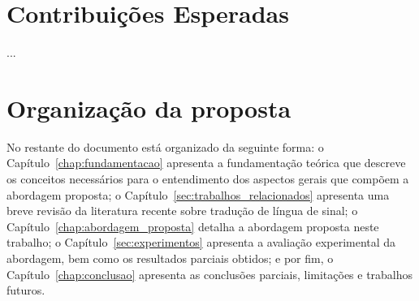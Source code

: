 \section{Contribuições Esperadas}\label{sec:contribuicao}

...

\section{Organização da proposta}\label{sec:organizacao}

No restante do documento está organizado da seguinte forma: o Capítulo~\ref{chap:fundamentacao} apresenta a fundamentação teórica que descreve os conceitos necessários para o entendimento dos aspectos gerais que compõem a abordagem proposta; o Capítulo~\ref{sec:trabalhos_relacionados} apresenta uma breve revisão da literatura recente sobre tradução de língua de sinal; o Capítulo~\ref{chap:abordagem_proposta} detalha a abordagem proposta neste trabalho; o Capítulo~\ref{sec:experimentos} apresenta a avaliação experimental da abordagem, bem como os resultados parciais obtidos; e por fim, o Capítulo~\ref{chap:conclusao} apresenta as conclusões parciais, limitações e trabalhos futuros.